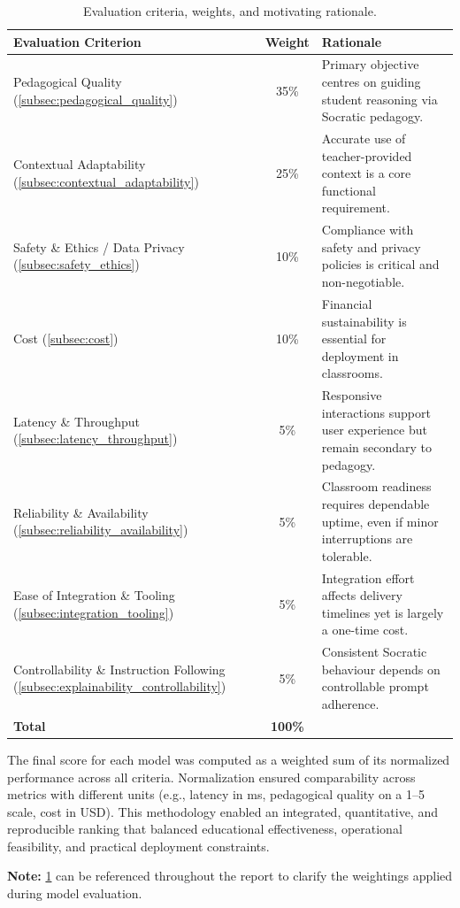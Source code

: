 \begin{table}[h!]
\centering
\caption{Evaluation criteria, weights, and motivating rationale.}
\label{tab:criteria_weights}
\begin{tabularx}{\textwidth}{@{}l c X@{}}
\toprule
\textbf{Evaluation Criterion} & \textbf{Weight} & \textbf{Rationale} \\ \midrule
Pedagogical Quality (\cref{subsec:pedagogical_quality}) & 35\% & Primary objective centres on guiding student reasoning via Socratic pedagogy. \\
Contextual Adaptability (\cref{subsec:contextual_adaptability}) & 25\% & Accurate use of teacher-provided context is a core functional requirement. \\
Safety \& Ethics / Data Privacy (\cref{subsec:safety_ethics}) & 10\% & Compliance with safety and privacy policies is critical and non-negotiable. \\
Cost (\cref{subsec:cost}) & 10\% & Financial sustainability is essential for deployment in classrooms. \\
Latency \& Throughput (\cref{subsec:latency_throughput}) & 5\% & Responsive interactions support user experience but remain secondary to pedagogy. \\
Reliability \& Availability (\cref{subsec:reliability_availability}) & 5\% & Classroom readiness requires dependable uptime, even if minor interruptions are tolerable. \\
Ease of Integration \& Tooling (\cref{subsec:integration_tooling}) & 5\% & Integration effort affects delivery timelines yet is largely a one-time cost. \\
Controllability \& Instruction Following (\cref{subsec:explainability_controllability}) & 5\% & Consistent Socratic behaviour depends on controllable prompt adherence. \\ \midrule
\textbf{Total} & \textbf{100\%} & \\ \bottomrule
\end{tabularx}
\end{table}

\FloatBarrier

The final score for each model was computed as a weighted sum of its normalized performance across all criteria. Normalization ensured comparability across metrics with different units (e.g., latency in ms, pedagogical quality on a 1–5 scale, cost in USD). This methodology enabled an integrated, quantitative, and reproducible ranking that balanced educational effectiveness, operational feasibility, and practical deployment constraints.

\noindent\textbf{Note:} \cref{tab:criteria_weights} can be referenced throughout the report to clarify the weightings applied during model evaluation.
